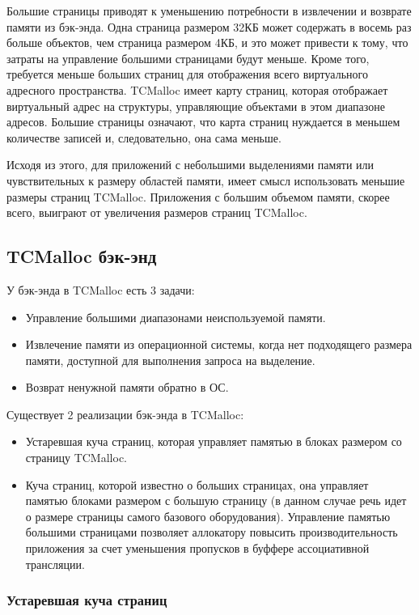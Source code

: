 Большие страницы приводят к уменьшению потребности в извлечении и возврате памяти из бэк-энда. Одна страница размером 32КБ может содержать в восемь раз больше объектов, чем страница размером 4КБ, и это может привести к тому, что затраты на управление большими страницами будут меньше. Кроме того, требуется меньше больших страниц для отображения всего виртуального адресного пространства. TCMalloc имеет карту страниц, которая отображает виртуальный адрес на структуры, управляющие объектами в этом диапазоне адресов. Большие страницы означают, что карта страниц нуждается в меньшем количестве записей и, следовательно, она сама меньше.

Исходя из этого, для приложений с небольшими выделениями памяти или чувствительных к размеру областей памяти, имеет смысл использовать меньшие размеры страниц TCMalloc. Приложения с большим объемом памяти, скорее всего, выиграют от увеличения размеров страниц TCMalloc.

\subsection{TCMalloc бэк-энд }

У бэк-энда в TCMalloc есть 3 задачи:
\begin{itemize}
	\item Управление большими диапазонами неиспользуемой памяти.
	\item Извлечение памяти из операционной системы, когда нет подходящего размера памяти, доступной для выполнения запроса на выделение.
	\item Возврат ненужной памяти обратно в ОС.
\end{itemize}

Существует 2 реализации бэк-энда в TCMalloc:
\begin{itemize}
	\item Устаревшая куча страниц, которая управляет памятью в блоках размером со страницу TCMalloc.
	\item Куча страниц, которой известно о больших страницах, она управляет памятью блоками размером с большую страницу (в данном случае речь идет о размере страницы самого базового оборудования). Управление памятью большими страницами позволяет аллокатору повысить производительность приложения за счет уменьшения пропусков в буффере ассоциативной трансляции.
\end{itemize}

\subsubsection{Устаревшая куча страниц}

